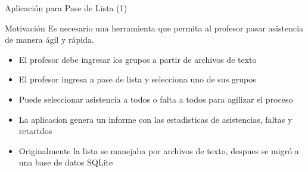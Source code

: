 
\begin{frame}{Aplicación para Pase de Lista (1)}
\begin{block}{Motivación} 
Es necesario una herramienta que permita al profesor pasar asistencia de manera ágil y rápida. 
\begin{itemize}
\item El profesor debe ingresar los grupos a partir de archivos de texto
\item El profesor ingresa a pase de lista y selecciona uno de sus grupos
\item Puede seleccionar asistencia a todos o falta a todos para agilizar el proceso
\item La aplicacion genera un informe con las estadisticas de asistencias, faltas y retartdos
\item Originalmente la lista se manejaba por archivos de texto, despues se migró a una base de datos SQLite
\end{itemize}
\end{block} 
\end{frame}



